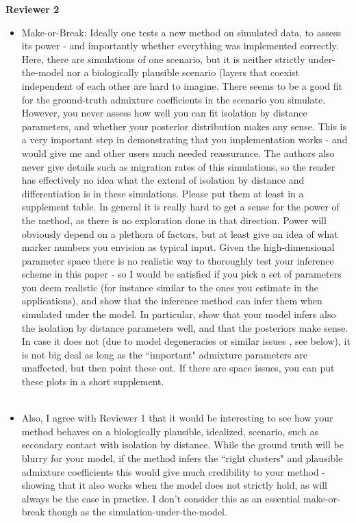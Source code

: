 \documentclass[11pt]{letter}
\newcommand{\gb}[1]{{\bf\color{black}{#1}}}
\begin{document}
\textbf{Reviewer 2}\\
\begin{itemize}
\item Make-or-Break:
Ideally one tests a new method on simulated data, to assess its power -
and importantly whether everything was implemented correctly.
Here, there are simulations of one scenario, but it is neither strictly under-the-model 
nor a biologically plausible scenario (layers that coexist independent of each other are hard to imagine.
There seems to be a good fit for the ground-truth admixture coefficients in the scenario you simulate. 
However, you never assess how well you can fit isolation by distance parameters, 
and whether your posterior distribution makes any sense. 
This is a very important step in demonstrating that you implementation works - 
and would give me and other users much needed reassurance.
The authors also never give details such as migration rates of this simulations, 
so the reader has effectively no idea what the extend of isolation by distance and differentiation is in these simulations. 
Please put them at least in a supplement table. 
In general it is really hard to get a sense for the power of the method, 
as there is no exploration done in that direction. 
Power will obviously depend on a plethora of factors, 
but at least give an idea of what marker numbers you envision as typical input.
Given the high-dimensional parameter space there is no realistic way to thoroughly test your inference scheme in this paper - 
so I would be satisfied if you pick a set of parameters you deem realistic 
(for instance similar to the ones you estimate in the applications), 
and show that the inference method can infer them when simulated under the model. 
In particular, show that your model infers also the isolation by distance parameters well, 
and that the posteriors make sense. 
In case it does not (due to model degeneracies or similar issues , see below), 
it is not big deal as long as the ``important" admixture parameters are unaffected, 
but then point these out.
If there are space issues, you can put these plots in a short supplement.\\\\
\gb{First, we want to thank Reviewer 2 for their very thorough  review
(even taking the time to check out the R package!).  
We really appreciate the time and thought the reviewer invested here.}


\item Also, I agree with Reviewer 1 that it would be interesting to see how your method behaves on a biologically plausible, 
idealized, scenario, such as secondary contact with isolation by distance. 
While the ground truth will be blurry for your model, 
if the method infers the ``right clusters" and plausible admixture coefficients 
this would give much credibility to your method - 
showing that it also works when the model does not strictly hold, 
as will always be the case in practice. 
I don't consider this as an essential make-or-break though as the simulation-under-the-model.\\\\
\gb{RESPONSE.}


\end{itemize}
\end{document}
